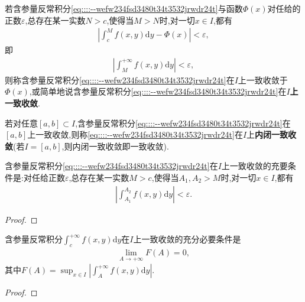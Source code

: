 \documentclass[../../main.tex]{subfiles}%
\begin{document}
\begin{definition}
若含参量反常积分\eqref{eq::::--wefw234fsd3480t34t3532jrwdr24t}与函数$\varPhi(x)$对任给的正数$\varepsilon$,总存在某一实数$N>c$,使得当$M>N$时,对一切$x\in I$,都有
\begin{align*}
\left| \int_{c}^{M}f(x,y)\mathrm{d}y - \varPhi(x) \right| < \varepsilon,
\end{align*}
即
\begin{align*}
\left| \int_{M}^{+\infty}f(x,y)\mathrm{d}y \right| < \varepsilon,
\end{align*}
则称含参量反常积分\eqref{eq::::--wefw234fsd3480t34t3532jrwdr24t}在$I$上一致收敛于$\varPhi(x)$,或简单地说含参量反常积分\eqref{eq::::--wefw234fsd3480t34t3532jrwdr24t}在$I$\textbf{上一致收敛}.

若对任意$[a,b]\subset I$,含参量反常积分\eqref{eq::::--wefw234fsd3480t34t3532jrwdr24t}在$[a,b]$上一致收敛,则称\eqref{eq::::--wefw234fsd3480t34t3532jrwdr24t}在$I$上\textbf{内闭一致收敛}(若$I=[a,b]$,则内闭一致收敛即一致收敛).
\end{definition}

\begin{theorem}[一致收敛的Cauchy准则]
含参量反常积分\eqref{eq::::--wefw234fsd3480t34t3532jrwdr24t}在$I$上一致收敛的充要条件是:对任给正数$\varepsilon$,总存在某一实数$M>c$,使得当$A_1,A_2>M$时,对一切$x\in I$,都有
\begin{align*}
\left| \int_{A_1}^{A_2}f(x,y)\mathrm{d}y \right| < \varepsilon. 
\end{align*}

\end{theorem}
\begin{proof}

\end{proof}

\begin{theorem}
含参量反常积分$\int_{c}^{+\infty}f(x,y)\mathrm{d}y$在$I$上一致收敛的充分必要条件是
\begin{align*}
\lim_{A \to +\infty}F(A)=0,
\end{align*}
其中$F(A)=\sup_{x\in I}\left| \int_{A}^{+\infty}f(x,y)\mathrm{d}y \right|$.
\end{theorem}
\begin{proof}

\end{proof}
\end{document}
